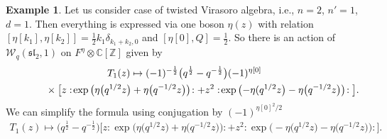 \documentclass[pdftex]{sigma}
\numberwithin{equation}{section}
\theoremstyle{definition}
\newtheorem{Example}[Theorem]{Example}
\newcommand{\half}{\frac{1}{2}}
\begin{document}
\begin{Example}Let us consider case of twisted Virasoro algebra, i.e., $n=2$, $n'=1$, $d=1$. Then everything is expressed via one boson $\eta(z)$ with relation $[\eta[k_1], \eta[k_2]] = \frac12 k_1 \delta_{k_1+k_2,0}$ and $[\eta[0], Q]=\frac12$. So there is an action of $\mathcal{W}_{q}(\mathfrak{sl}_2, 1)$ on $F^{\eta} \otimes \mathbb{C}[ \mathbb{Z}]$ given by
\begin{gather*}
T_1 (z) \mapsto (-1)^{-\frac12} \big(q^{\half}-q^{-\half}\big) (-1)^{\eta[0]} \\
\hphantom{T_1 (z) \mapsto}{}\times \big[ z : \! \exp \big( \eta\big(q^{1/2} z\big) + \eta\big(q^{-1/2} z\big) \big) \! : + z^{2} : \! \exp \big( {-}\eta(q^{1/2} z\big) - \eta\big(q^{-1/2} z\big) \big) \! : \big].
\end{gather*}
We can simplify the formula using conjugation by $(-1)^{\eta[0]^2/2}$
\begin{gather*}
T_1 (z) \mapsto \big(q^{\half}-q^{-\half}\big) \big[ z :\!\exp \big( \eta(q^{1/2} z\big) + \eta\big(q^{-1/2} z\big) \big)\!: + z^{2}:\! \exp \big( {-}\eta\big(q^{1/2} z\big) - \eta\big(q^{-1/2} z\big) \big)\!: \big].
\end{gather*}
\end{Example}
\end{document}
